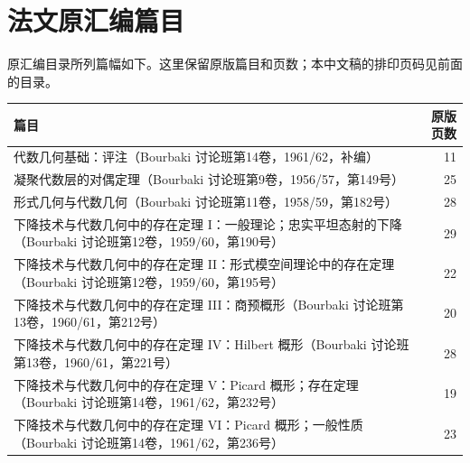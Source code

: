 \chapter*{法文原汇编篇目}
原汇编目录所列篇幅如下。这里保留原版篇目和页数；本中文稿的排印页码见前面的目录。
\begin{center}
\begin{tabular}{p{}r}
篇目 & 原版页数\\\hline
代数几何基础：评注（Bourbaki 讨论班第14卷，1961/62，补编） & 11\\
凝聚代数层的对偶定理（Bourbaki 讨论班第9卷，1956/57，第149号） & 25\\
形式几何与代数几何（Bourbaki 讨论班第11卷，1958/59，第182号） & 28\\
下降技术与代数几何中的存在定理 I：一般理论；忠实平坦态射的下降（Bourbaki 讨论班第12卷，1959/60，第190号） & 29\\
下降技术与代数几何中的存在定理 II：形式模空间理论中的存在定理（Bourbaki 讨论班第12卷，1959/60，第195号） & 22\\
下降技术与代数几何中的存在定理 III：商预概形（Bourbaki 讨论班第13卷，1960/61，第212号） & 20\\
下降技术与代数几何中的存在定理 IV：Hilbert 概形（Bourbaki 讨论班第13卷，1960/61，第221号） & 28\\
下降技术与代数几何中的存在定理 V：Picard 概形；存在定理（Bourbaki 讨论班第14卷，1961/62，第232号） & 19\\
下降技术与代数几何中的存在定理 VI：Picard 概形；一般性质（Bourbaki 讨论班第14卷，1961/62，第236号） & 23
\end{tabular}
\end{center}
\mainmatter
\pagestyle{fancy}
\setcounter{part}{-1}
\renewcommand\thepart{}
\renewcommand\fgaAnchorPrefix{fga-foreword}

